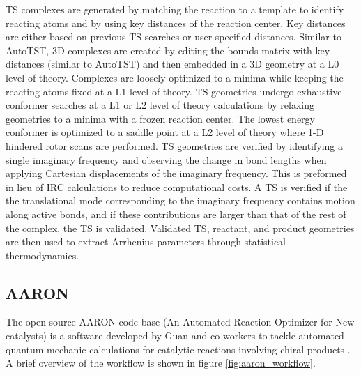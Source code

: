 \documentclass[preprint, 11pt]{elsarticle} %
\begin{document}
TS complexes are generated by matching the reaction to a template to identify reacting atoms and by using key distances of the reaction center. 
Key distances are either based on previous TS searches or user specified distances.
Similar to AutoTST, 3D complexes are created by editing the bounds matrix with key distances (similar to AutoTST) and then embedded in  a 3D geometry at a L0 level of theory.
Complexes are loosely optimized to a minima while keeping the reacting atoms fixed at a L1 level of theory.
TS geometries undergo exhaustive conformer searches at a L1 or L2 level of theory calculations by relaxing geometries to a minima with a frozen reaction center.
The lowest energy conformer is optimized to a saddle point at a L2 level of theory where 1-D hindered rotor scans are performed. 
TS geometries are verified by identifying a single imaginary frequency and observing the change in bond lengths when applying Cartesian displacements of the imaginary frequency.
This is preformed in lieu of  IRC calculations to reduce computational costs.
A TS is verified if the the translational mode corresponding to the imaginary frequency contains motion along active bonds, and if these contributions are larger than that of the rest of the complex, the TS is validated. 
Validated TS, reactant, and product geometries are then used to extract Arrhenius parameters through statistical thermodynamics.


\subsection{AARON}

The open-source AARON code-base (An Automated Reaction Optimizer for New catalysts) is a software developed by Guan and co-workers to tackle automated quantum mechanic calculations for catalytic reactions involving chiral products \cite{Guan:2018}. 
A brief overview of the workflow is shown in figure \ref{fig:aaron_workflow}.
\end{document}
